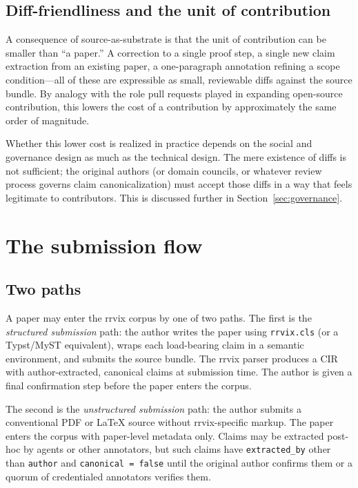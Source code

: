 \documentclass[11pt]{rrvix}
\begin{document}
\subsection{Diff-friendliness and the unit of contribution}

A consequence of source-as-substrate is that the unit of contribution can be smaller than ``a paper.'' A correction to a single proof step, a single new claim extraction from an existing paper, a one-paragraph annotation refining a scope condition---all of these are expressible as small, reviewable diffs against the source bundle. By analogy with the role pull requests played in expanding open-source contribution, this lowers the cost of a contribution by approximately the same order of magnitude.

Whether this lower cost is realized in practice depends on the social and governance design as much as the technical design. The mere existence of diffs is not sufficient; the original authors (or domain councils, or whatever review process governs claim canonicalization) must accept those diffs in a way that feels legitimate to contributors. This is discussed further in Section~\ref{sec:governance}.

\section{The submission flow}
\label{sec:submission}

\subsection{Two paths}

A paper may enter the rrvix corpus by one of two paths. The first is the \emph{structured submission} path: the author writes the paper using \texttt{rrvix.cls} (or a Typst/MyST equivalent), wraps each load-bearing claim in a semantic environment, and submits the source bundle. The rrvix parser produces a CIR with author-extracted, canonical claims at submission time. The author is given a final confirmation step before the paper enters the corpus.

The second is the \emph{unstructured submission} path: the author submits a conventional PDF or LaTeX source without rrvix-specific markup. The paper enters the corpus with paper-level metadata only. Claims may be extracted post-hoc by agents or other annotators, but such claims have \texttt{extracted\_by} other than \texttt{author} and \texttt{canonical = false} until the original author confirms them or a quorum of credentialed annotators verifies them.
\end{document}
